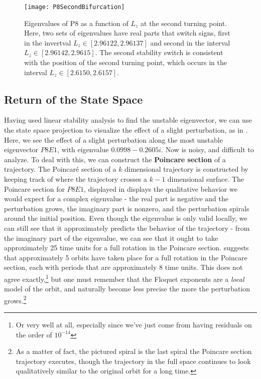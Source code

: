 \begin{figure}[h]
\texttt{[image: P8SecondBifurcation]}
\caption{Eigenvalues of P8 as a function of $L_z$ at the second turning point. Here, two sets of eigenvalues have real parts that switch signs, first in the invertval $L_z \in [2.96122,2.96137]$ and second in the interval $L_z \in [ 2.96142,2.9615]$. The second stability switch is consistent with the position of the second turning point, which occurs in the interval $L_z \in [2.6150,2.6157]$.}\label{fig:P8SecondBifurcation}
\end{figure}

\subsection{Return of the State Space}

Having used linear stability analysis to find the unstable eigenvector, we can use the state space projection to visualize the effect of a slight perturbation, as  in . Here, we see the effect of a slight perturbation along the most unstable eigenvector $P8E1$, with eigenvalue $0.0998 - 0.2605 i$. Now  is noisy, and difficult to analyze. To deal with this, we can construct the {\bf Poincare section} of a trajectory. The Poincaré section of a $k$ dimensional trajectory is constructed by keeping track of where the trajectory crosses a $k-1$ dimensional surface. The Poincare section for  $P8E1$, displayed in  displays the qualitative behavior we would expect for a complex eigenvalue - the real part is negative and the perturbation grows, the imaginary part is nonzero, and the perturbation spirals around the initial position. Even though the eigenvalue is only valid locally, we can still see that it approximately predicts the behavior of the trajectory - from the imaginary part of the eigenvalue, we can see that it ought to take approximately 25 time units for a full rotation in the Poincare section.  suggests that approximately 5 orbits have taken place for a full rotation in the Poincare section, each with periods that are approximately 8 time units. This does not agree exactly,\footnote{Or very well at all, especially since we've just come from having residuals on the order of $10^{-14}$} but one must remember that the Floquet exponents are a \emph{local} model of the orbit, and naturally become less precise the more the perturbation grows.\footnote{As a matter of fact, the pictured spiral is the last spiral the Poincare section trajectory executes, though the trajectory in the full space continues to look qualitatively similar to the original orbit for a long time.}   


